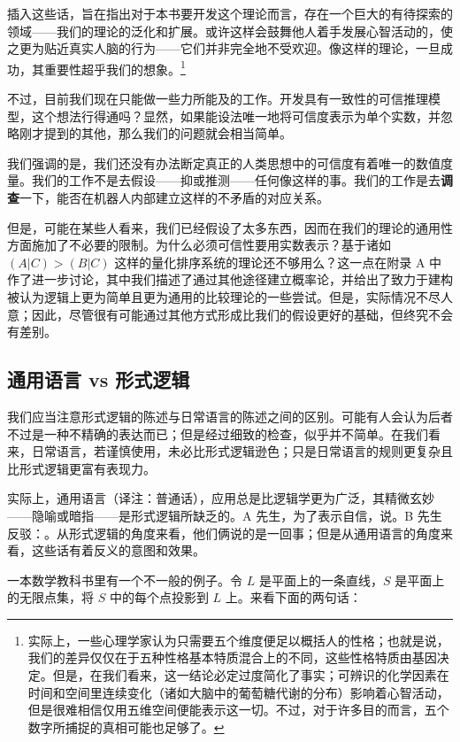 插入这些话，旨在指出对于本书要开发这个理论而言，存在一个巨大的有待探索的领域——我们的理论的泛化和扩展。或许这样会鼓舞他人着手发展心智活动的，使之更为贴近真实人脑的行为——它们并非完全地不受欢迎。像这样的理论，一旦成功，其重要性超乎我们的想象。\footnote{实际上，一些心理学家认为只需要五个维度便足以概括人的性格；也就是说，我们的差异仅仅在于五种性格基本特质混合上的不同，这些性格特质由基因决定。但是，在我们看来，这一结论必定过度简化了事实；可辨识的化学因素在时间和空间里连续变化（诸如大脑中的葡萄糖代谢的分布）影响着心智活动，但是很难相信仅用五维空间便能表示这一切。不过，对于许多目的而言，五个数字所捕捉的真相可能也足够了。}

不过，目前我们现在只能做一些力所能及的工作。开发具有一致性的可信推理模型，这个想法行得通吗？显然，如果能设法唯一地将可信度表示为单个实数，并忽略刚才提到的其他，那么我们的问题就会相当简单。

我们强调的是，我们还没有办法断定真正的人类思想中的可信度有着唯一的数值度量。我们的工作不是去假设——抑或推测——任何像这样的事。我们的工作是去{\bf 调查}一下，能否在机器人内部建立这样的不矛盾的对应关系。

但是，可能在某些人看来，我们已经假设了太多东西，因而在我们的理论的通用性方面施加了不必要的限制。为什么必须可信性要用实数表示？基于诸如 $(A|C) > (B|C)$ 这样的量化排序系统的理论还不够用么？这一点在附录 A 中作了进一步讨论，其中我们描述了通过其他途径建立概率论，并给出了致力于建构被认为逻辑上更为简单且更为通用的比较理论的一些尝试。但是，实际情况不尽人意；因此，尽管很有可能通过其他方式形成比我们的假设更好的基础，但终究不会有差别。

\subsection{通用语言 vs 形式逻辑}

我们应当注意形式逻辑的陈述与日常语言的陈述之间的区别。可能有人会认为后者不过是一种不精确的表达而已；但是经过细致的检查，似乎并不简单。在我们看来，日常语言，若谨慎使用，未必比形式逻辑逊色；只是日常语言的规则更复杂且比形式逻辑更富有表现力。

实际上，通用语言（译注：普通话），应用总是比逻辑学更为广泛，其精微玄妙——隐喻或暗指——是形式逻辑所缺乏的。A 先生，为了表示自信，说。B 先生反驳：。从形式逻辑的角度来看，他们俩说的是一回事；但是从通用语言的角度来看，这些话有着反义的意图和效果。

一本数学教科书里有一个不一般的例子。令 $L$ 是平面上的一条直线，$S$ 是平面上的无限点集，将 $S$ 中的每个点投影到 $L$ 上。来看下面的两句话：

